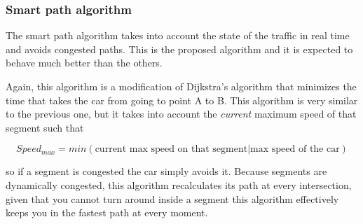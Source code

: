 \subsubsection{Smart path algorithm}

The smart path algorithm takes into account the state of the traffic in real time and avoids congested paths. This is the proposed algorithm and it is expected to behave much better than the others.

Again, this algorithm is a modification of Dijkstra's algorithm that minimizes the time that takes the car from going to point A to B. This algorithm is very similar to the previous one, but it takes into account the \emph{current} maximum speed of that segment such that

\[Speed_{max} = min(\text{current max speed on that segment} | \text{max speed of the car})\]

so if a segment is congested the car simply avoids it. Because segments are dynamically congested, this algorithm recalculates its path at every intersection, given that you cannot turn around inside a segment this algorithm effectively keeps you in the fastest path at every moment.









